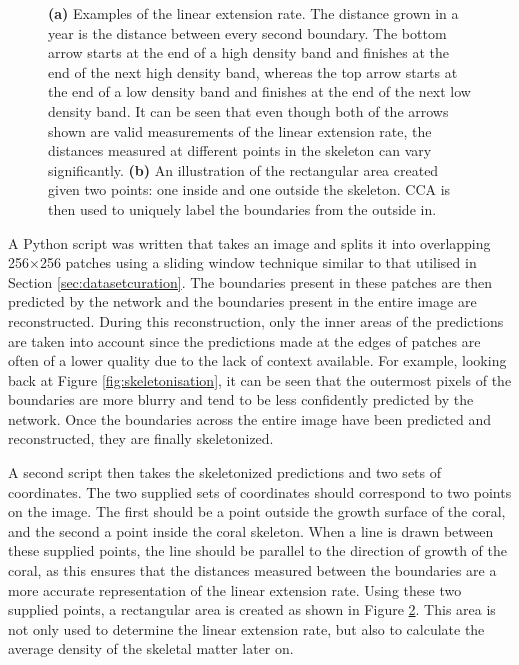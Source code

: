 \begin{figure}[t]
\begin{subfigure}[t]{0.49\textwidth}
        \caption{}
        \label{fig:calcificationrect}
    \end{subfigure}
    \caption{\textbf{(a)} Examples of the linear extension rate. The distance grown in a year is the distance between every second boundary. The bottom arrow starts at the end of a high density band and finishes at the end of the next high density band, whereas the top arrow starts at the end of a low density band and finishes at the end of the next low density band. It can be seen that even though both of the arrows shown are valid measurements of the linear extension rate, the distances measured at different points in the skeleton can vary significantly. \textbf{(b)} An illustration of the rectangular area created given two points: one inside and one outside the skeleton. CCA is then used to uniquely label the boundaries from the outside in.}
\end{figure}

A Python script was written that takes an image and splits it into overlapping 256$\times$256 patches using a sliding window technique similar to that utilised in Section \ref{sec:datasetcuration}. The boundaries present in these patches are then predicted by the network and the boundaries present in the entire image are reconstructed. During this reconstruction, only the inner areas of the predictions are taken into account since the predictions made at the edges of patches are often of a lower quality due to the lack of context available. For example, looking back at Figure \ref{fig:skeletonisation}, it can be seen that the outermost pixels of the boundaries are more blurry and tend to be less confidently predicted by the network. Once the boundaries across the entire image have been predicted and reconstructed, they are finally skeletonized.

A second script then takes the skeletonized predictions and two sets of coordinates. The two supplied sets of coordinates should correspond to two points on the image. The first should be a point outside the growth surface of the coral, and the second a point inside the coral skeleton. When a line is drawn between these supplied points, the line should be parallel to the direction of growth of the coral, as this ensures that the distances measured between the boundaries are a more accurate representation of the linear extension rate. Using these two supplied points, a rectangular area is created as shown in Figure \ref{fig:calcificationrect}. This area is not only used to determine the linear extension rate, but also to calculate the average density of the skeletal matter later on.

